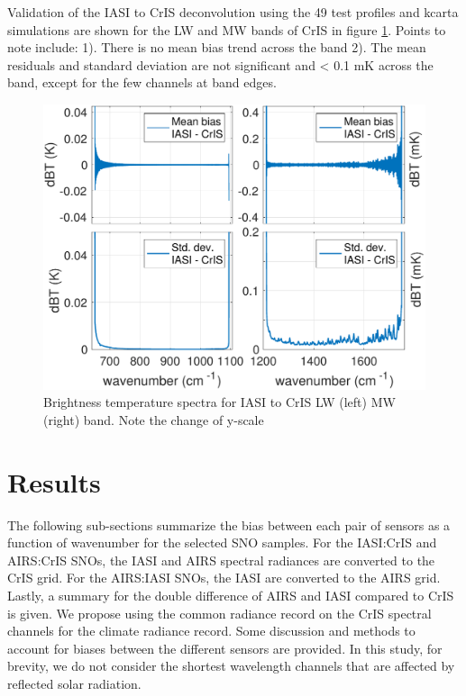 \documentclass[twocolumn,10pt]{article}
\begin{document}

Validation of the IASI to CrIS deconvolution using the 49 test profiles and kcarta simulations are shown for the LW and MW bands of CrIS in figure \ref{fig:2a}. Points to note include: 1). There is no mean bias trend across the band 2). The mean residuals and standard deviation are not significant and < 0.1 mK across the band, except for the few channels at band edges.

\begin{figure}[htb]
\centering
\includegraphics[width=\linewidth]{./figs/fig2_adjust.pdf}
\caption{
  Brightness temperature spectra for IASI to CrIS LW (left) MW (right) band. Note the change of y-scale}
\label{fig:2a}
\end{figure}



\section{Results}
The following sub-sections summarize the bias between each pair of sensors as a function of wavenumber for the selected SNO samples. For the IASI:CrIS and AIRS:CrIS SNOs, the IASI and AIRS spectral radiances are converted to the CrIS grid.  For the AIRS:IASI SNOs, the IASI are converted to the AIRS grid. Lastly, a summary for the double difference of AIRS and IASI compared to CrIS is given. We propose using the common radiance record on the CrIS spectral channels for the climate radiance record. Some discussion and methods to account for biases between the different sensors are provided. In this study, for brevity, we do not consider the shortest wavelength channels that are affected by reflected solar radiation.
\end{document}
